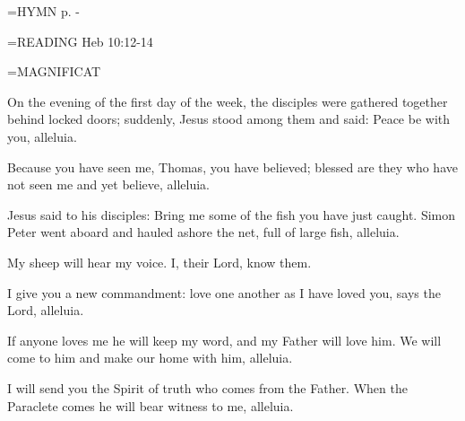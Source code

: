 \hangindent=\parindent \small{\uppercase{HYMN} p.  \pageref{easter:firstHymn} - \pageref{easter:lastHymn}\\}

\hangindent=\parindent \small{READING}    Heb 10:12-14 \textbf{   \\}

\hangindent=\parindent \small MAGNIFICAT
\begin{description}[labelindent=\parindent, noitemsep, leftmargin=*]
\item [Easter Sunday:] 	On the evening of the first day of the week, the disciples were gathered together behind locked doors; suddenly, Jesus stood among them and said: Peace be with you, alleluia.
\item [Divine Mercy Sunday:] 	Because you have seen me, Thomas, you have believed; blessed are they who have not seen me and yet believe, alleluia.
\item [3rd Sunday:] 		Jesus said to his disciples: Bring me some of the fish you have just caught. Simon Peter went aboard and hauled ashore the net, full of large fish, alleluia.
\item [4th Sunday:] 		My sheep will hear my voice. I, their Lord, know them.
\item [5th Sunday:] 		I give you a new commandment: love one another as I have loved you, says the Lord, alleluia.
\item [6th Sunday:] 		If anyone loves me he will keep my word, and my Father will love him. We will come to him and make our home with him, alleluia.
\item [7th Sunday:] 		I will send you the Spirit of truth who comes from the Father. When the Paraclete comes he will bear witness to me, alleluia.
\end{description}
